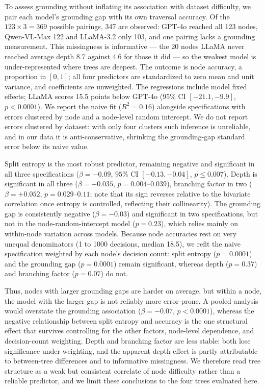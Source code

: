 To assess grounding without inflating its association with dataset difficulty, we pair each model's grounding gap with its own traversal accuracy. Of the $123\times3=369$ possible pairings, 347 are observed: GPT-4o reached all 123 nodes, Qwen-VL-Max 122 and LLaMA-3.2 only 103, and one pairing lacks a grounding measurement. This missingness is informative --- the 20 nodes LLaMA never reached average depth 8.7 against 4.6 for those it did --- so the weakest model is under-represented where trees are deepest. The outcome is node accuracy, a proportion in $[0,1]$; all four predictors are standardized to zero mean and unit variance, and coefficients are unweighted. The regressions include model fixed effects; LLaMA scores 15.5 points below GPT-4o ($95\%$ CI $[-21.1,-9.9]$, $p<0.0001$). We report the naive fit ($R^2=0.16$) alongside specifications with errors clustered by node and a node-level random intercept. We do not report errors clustered by dataset: with only four clusters such inference is unreliable, and in our data it is anti-conservative, shrinking the grounding-gap standard error below its naive value.

Split entropy is the most robust predictor, remaining negative and significant in all three specifications ($\beta=-0.09$, $95\%$ CI $[-0.13,-0.04]$, $p\leq0.007$). Depth is significant in all three ($\beta=+0.035$, $p=0.004$--$0.039$), branching factor in two ($\beta=+0.052$, $p=0.029$--$0.11$; note that its sign reverses relative to the bivariate correlation once entropy is controlled, reflecting their collinearity). The grounding gap is consistently negative ($\beta=-0.03$) and significant in two specifications, but not in the node-random-intercept model ($p=0.23$), which relies mainly on within-node variation across models. Because node accuracies rest on very unequal denominators (1 to 1000 decisions, median 18.5), we refit the naive specification weighted by each node's decision count: split entropy ($p=0.0001$) and the grounding gap ($p=0.0001$) remain significant, whereas depth ($p=0.37$) and branching factor ($p=0.07$) do not.

Thus, nodes with larger grounding gaps are harder on average, but within a node, the model with the larger gap is not reliably more error-prone. A pooled analysis would overstate the grounding association ($\beta=-0.07$, $p<0.0001$), whereas the negative relationship between split entropy and accuracy is the one structural effect that survives controlling for the other factors, node-level dependence, and decision-count weighting. Depth and branching factor are less stable: both lose significance under weighting, and the apparent depth effect is partly attributable to between-tree differences and to informative missingness. We therefore read tree structure as a weak but consistent correlate of node difficulty rather than a reliable predictor, and we limit these conclusions to the four trees evaluated here.
